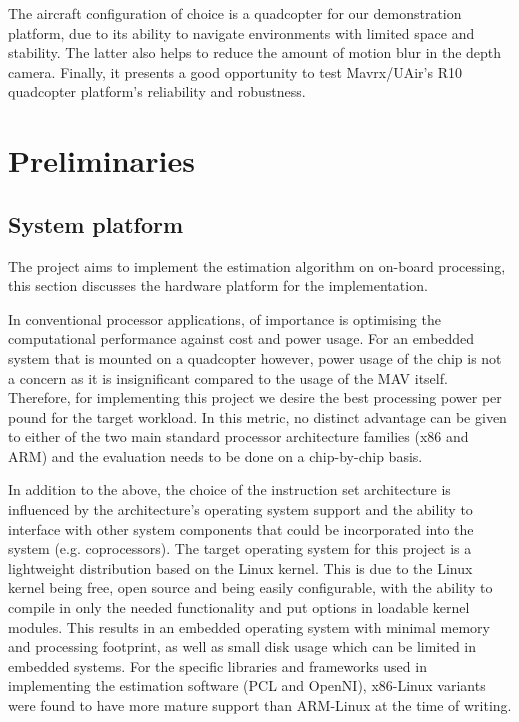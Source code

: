 \documentclass[]{article}
\begin{document}
{The aircraft configuration of choice is a quadcopter for our demonstration platform, due to its ability to navigate environments with limited space and stability. The latter also helps to reduce the amount of motion blur in the depth camera. Finally, it presents a good opportunity to test Mavrx/UAir's R10 quadcopter platform's reliability and robustness.


\section{Preliminaries}

\subsection{System platform} %
\label{sub:system_platform}

The project aims to implement the estimation algorithm on on-board processing, this section discusses the hardware platform for the implementation.

In conventional processor applications, of importance is optimising the computational performance against cost and power usage. For an embedded system that is mounted on a quadcopter however, power usage of the chip is not a concern as it is insignificant compared to the usage of the MAV itself. Therefore, for implementing this project we desire the best processing power per pound for the target workload. In this metric, no distinct advantage can be given to either of the two main standard processor architecture families (x86 and ARM) and the evaluation needs to be done on a chip-by-chip basis. 

In addition to the above, the choice of the instruction set architecture is influenced by the architecture's operating system support and the ability to interface with other system components that could be incorporated into the system (e.g. coprocessors). The target operating system for this project is a lightweight distribution based on the Linux kernel. This is due to the Linux kernel being free, open source and being easily configurable, with the ability to compile in only the needed functionality and put options in loadable kernel modules. This results in an embedded operating system with minimal memory and processing footprint, as well as small disk usage which can be limited in embedded systems. For the specific libraries and frameworks used in implementing the estimation software (PCL and OpenNI), x86-Linux variants were found to have more mature support than ARM-Linux at the time of writing.

}
\end{document}

